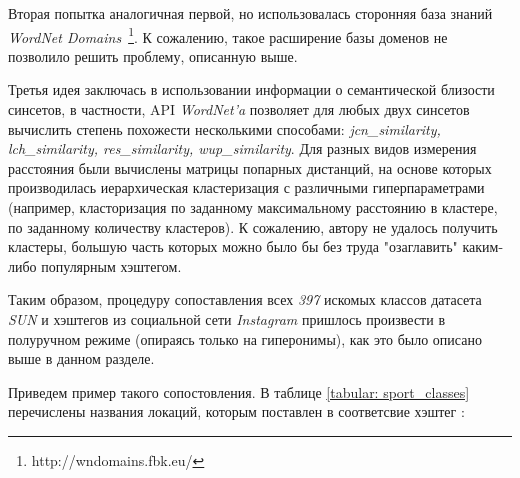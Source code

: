 \indent
\indent
Вторая попытка аналогичная первой, но использовалась сторонняя база знаний
\textit{WordNet Domains}~\footnote{http://wndomains.fbk.eu/}. К сожалению, такое
расширение базы доменов не позволило решить проблему, описанную выше.


\indent
\indent
Третья идея заключась в использовании информации о семантической близости 
синсетов, в частности, API \textit{WordNet'a} позволяет для любых двух синсетов
вычислить степень похожести несколькими способами:
\textit{jcn\_similarity, lch\_similarity, res\_similarity, wup\_similarity}.
Для разных видов измерения расстояния были вычислены матрицы попарных дистанций,
на основе которых производилась иерархическая кластеризация с различными
гиперпараметрами
 (например, класторизация по заданному максимальному расстоянию в кластере, 
по заданному количеству кластеров). К сожалению, автору не удалось получить кластеры,
большую часть которых можно было бы без труда "озаглавить" 
каким-либо популярным хэштегом.


\indent
\indent
Таким образом, процедуру сопоставления всех 
\textit{397} искомых классов датасета \textit{SUN} и хэштегов из социальной сети \textit{Instagram}
пришлось произвести в полуручном режиме (опираясь только на гиперонимы),
как это было описано выше в данном разделе.


\indent
\indent
Приведем пример такого сопостовления. В таблице \ref{tabular: sport_classes} 
перечислены названия локаций, которым поставлен в соответсвие хэштег :

